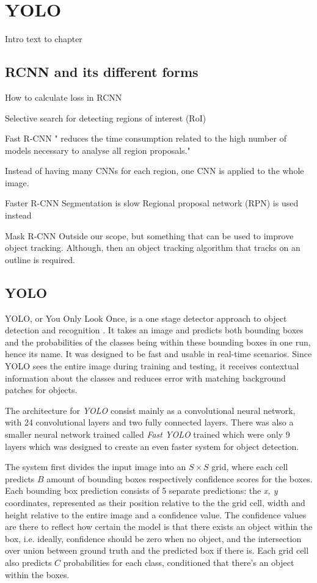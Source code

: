 \chapter{YOLO}
Intro text to chapter

\section{RCNN and its different forms}

How to calculate loss in RCNN

Selective search for detecting regions of interest (RoI)

Fast R-CNN
" reduces the time consumption related to the high number of models necessary to analyse all region proposals."

Instead of having many CNNs for each region, one CNN is applied to the whole image.

Faster R-CNN
Segmentation is slow
Regional proposal network (RPN) is used instead

Mask R-CNN
Outside our scope, but something that can be used to improve object tracking.
Although, then an object tracking algorithm that tracks on an outline is required.

\section{YOLO}
YOLO, or You Only Look Once, is a one stage detector approach to object detection and
 recognition \cite{YOLO1}. It takes an image and predicts both bounding boxes and the probabilities of the classes being within these bounding boxes in one run, hence its name. It was designed to be fast and usable in real-time scenarios. Since YOLO sees the entire image during training and testing, it receives contextual information about the classes and reduces error with matching background patches for objects. 
 
 The architecture for \textit{YOLO} consist mainly as a convolutional neural network, with 24 convolutional layers and two fully connected layers. There was also a smaller neural network trained called \textit{Fast YOLO} trained which were only 9 layers which was designed to create an even faster system for object detection. 
 
 The system first divides the input image into an  $S \times S$  grid, where each cell predicts $B$ amount of bounding boxes respectively confidence scores for the boxes. Each bounding box prediction consists of 5 separate predictions: the \textit{x, y} coordinates, represented as their position relative to the the grid cell, width and height relative to the entire image and a confidence value. The confidence values are there to reflect how certain the model is that there exists an object within the box, i.e. ideally, confidence should be zero when no object, and the intersection over union between ground truth and the predicted box if there is. Each grid cell also predicts $C$ probabilities for each class, conditioned that there's an object within the boxes. 
 
